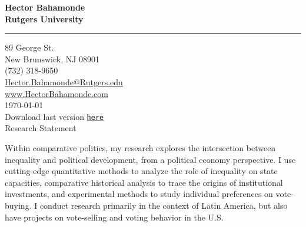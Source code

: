 \documentclass[11pt]{letter} %
\date{}
\begin{document}

\begin{letter}{} 


\begin{center}
\large\bf Hector Bahamonde \\ %
Rutgers University\\
\vspace{20pt} \hrule height 1pt %
89 George St. \\ New Brunswick, NJ 08901 \\ (732) 318-9650 \\ 
{\normalfont\normalsize\href{mailto:hector.bahamonde@rutgers.edu}{Hector.Bahamonde@Rutgers.edu}} \\
{\normalfont\normalsize\href{http://www.hectorbahamonde.com}{www.HectorBahamonde.com}}\\
{\normalfont \scriptsize{
\vspace{5mm}\today\\
Download last version \href{http://github.com/hbahamonde/Job_Market/raw/master/Bahamonde_Research_Statement.pdf}{\texttt{here}}}} %
\\
{\huge\vspace{8mm} Research Statement}
\end{center} 


\opening{} 
 
Within comparative politics, my research explores the intersection between inequality and political development, from a political economy perspective. I use cutting-edge quantitative methods to analyze the role of inequality on state capacities, comparative historical analysis to trace the origins of institutional investments, and experimental methods to study individual preferences on vote-buying. I conduct research primarily in the context of Latin America, but also have projects on vote-selling and voting behavior in the U.S. 



\end{letter}
\end{document}
